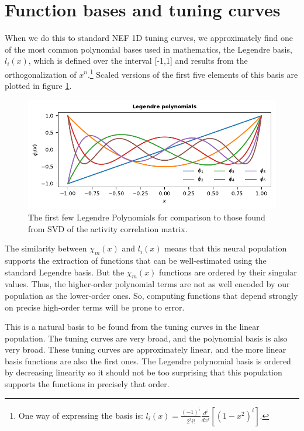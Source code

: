 \documentclass[10pt,letterpaper,oneside]{article}
\begin{document}
\section{Function bases and tuning curves}

When we do this to standard NEF 1D tuning curves, we approximately find one of the most common polynomial bases
used in mathematics, the Legendre basis,
$l_{i}(x)$, which is defined over the interval {[}-1,1{]} and results
from the orthogonalization of $x^{n}$.\footnote{One way of expressing the basis is: $l_{i}(x)=\frac{(-1)^{i}}{2^{i}i!}\frac{d^{i}}{dx^{i}}\left[\left(1-x^{2}\right)^{i}\right]$.}
Scaled versions of the first five elements of this basis are plotted
in figure \ref{c5.fig.broad.chi}. 

\begin{figure}[t]
  \centering
  \includegraphics{media/legendre.pdf}
  \caption{The first few Legendre Polynomials for comparison to those found from SVD of the activity correlation matrix.}
	\label{c5.fig.broad.chi}
\end{figure}

The similarity between $\chi_{m}(x)$ and $l_{i}(x)$ means that this
neural population supports the extraction of functions that can be
well-estimated using the standard Legendre basis. But the $\chi_{m}(x)$
functions are ordered by their singular values. Thus, the higher-order
polynomial terms are not as well encoded by our population as the
lower-order ones. So, computing functions that depend strongly on
precise high-order terms will be prone to error.

This is a natural basis to be found from the tuning curves in the
linear population. The tuning curves are very broad, and the polynomial
basis is also very broad. These tuning curves are approximately linear,
and the more linear basis functions are also the first ones. The Legendre
polynomial basis is ordered by decreasing linearity so it should not
be too surprising that this population supports the functions in precisely
that order. 
\end{document}
